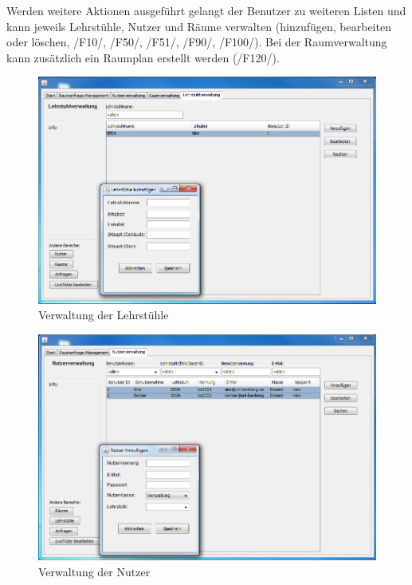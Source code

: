 Werden weitere Aktionen ausgeführt gelangt der Benutzer zu weiteren Listen und kann jeweils Lehrstühle, Nutzer und Räume verwalten (hinzufügen, bearbeiten oder löschen, /F10/, /F50/, /F51/, /F90/, /F100/). Bei der Raumverwaltung kann zusätzlich ein Raumplan erstellt werden (/F120/).
\begin{figure}[H]
\begin{center}
\includegraphics[width=170mm]{images/section_7/VerwaltungLehrstuhlverwaltung.PNG}
\caption{Verwaltung der Lehrstühle}
\label{img:LehrstuhlVerw}
\end{center}
\end{figure}

\begin{figure}[H]
\begin{center}
\includegraphics[width=170mm]{images/section_7/VerwaltungNutzerverwaltung.PNG}
\caption{Verwaltung der Nutzer}
\label{img:NutzerVerw}
\end{center}
\end{figure}


